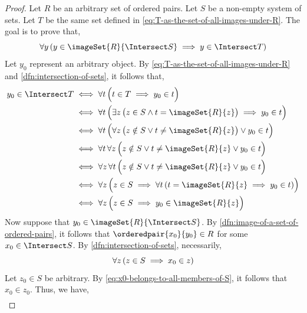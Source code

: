 \begin{proof}
    Let \( R \) be an arbitrary set of ordered pairs. Let \( S \) be a non-empty system of sets.
    Let \( T \) be the same set defined in \eqref{eq:T-as-the-set-of-all-images-under-R}. The goal
    is to prove that,
    \begin{equation*}
        \forall y \, \mleft( y \in \imageSet{R}{\Intersect S} \implies y \in \Intersect T \mright)
    \end{equation*}
    Let \( y_{0} \) represent an arbitrary object. By \eqref{eq:T-as-the-set-of-all-images-under-R} and
    \cref{dfn:intersection-of-sets}, it follows that,
    \begin{align}
        \label{eq:condition-for-y0-to-belong-to-the-intersection-of-T}
        y_{0} \in \Intersect T
        &\iff
        \forall t \, \Big( t \in T \implies y_{0} \in t \Big) \notag \\
        &\iff
        \forall t \, \Big( \exists z \, \big( z \in S \land t = \imageSet{R}{z} \big) \implies y_{0} \in t \Big) \notag \\
        &\iff
        \forall t \, \Big( \forall z \, \big( z \notin S \lor t \neq \imageSet{R}{z} \big) \lor y_{0} \in t \Big) \notag \\
        &\iff
        \forall t \, \forall z \, \Big( z \notin S \lor t \neq \imageSet{R}{z} \lor y_{0} \in t \Big) \notag \\
        &\iff
        \forall z \, \forall t \, \Big( z \notin S \lor t \neq \imageSet{R}{z} \lor y_{0} \in t \Big) \notag \\
        &\iff
        \forall z \, \Big( z \in S \implies \forall t \, \mleft( t = \imageSet{R}{z} \implies y_{0} \in t \mright) \Big) \notag \\
        &\iff
        \forall z \, \Big( z \in S \implies y_{0} \in \imageSet{R}{z} \Big)
    \end{align}
    Now suppose that \( y_{0} \in \imageSet{R}{\Intersect S} \).
    By \cref{dfn:image-of-a-set-of-ordered-pairs}, it follows that \( \orderedpair{x_{0}}{y_{0}} \in R \)
    for some \( x_{0} \in \Intersect S \).
    By \cref{dfn:intersection-of-sets}, necessarily,
    \begin{equation}
        \label{eq:x0-belongs-to-all-members-of-S}
        \forall z \, \mleft( z \in S \implies x_{0} \in z \mright)
    \end{equation}
    Let \( z_{0} \in S \) be arbitrary. By \eqref{eq:x0-belongs-to-all-members-of-S}, it follows that \( x_{0} \in z_{0} \). Thus, we have,
    \begin{gather*}

\end{gather*}
\end{proof}
